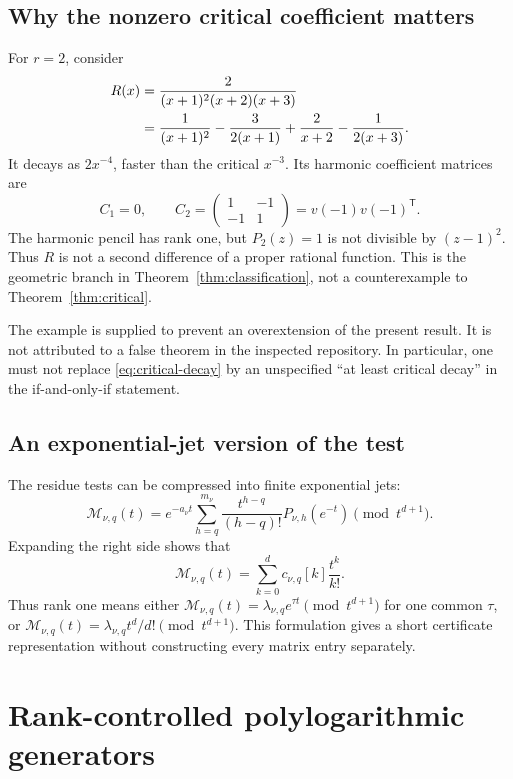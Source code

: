 \documentclass[11pt,letterpaper]{article}
\numberwithin{equation}{section}
\theoremstyle{definition}\newtheorem{definition}[theorem]{Definition}
\theoremstyle{remark}\newtheorem{remark}[theorem]{Remark}
\begin{document}
\subsection{Why the nonzero critical coefficient matters}
\label{sec:counterexample}
For $r=2$, consider
\begin{align}
 R(x)&=\frac{2}{(x+1)^2(x+2)(x+3)}\label{eq:counterexample}\\
 &=\frac1{(x+1)^2}-\frac{3}{2(x+1)}
       +\frac2{x+2}-\frac1{2(x+3)}.\notag
\end{align}
It decays as $2x^{-4}$, faster than the critical $x^{-3}$.
Its harmonic coefficient matrices are
\[
 C_1=0,\qquad
 C_2=\begin{pmatrix}1&-1\\-1&1\end{pmatrix}
       =v(-1)v(-1)^{\mathsf T}.
\]
The harmonic pencil has rank one, but $P_2(z)=1$ is not divisible
by $(z-1)^2$. Thus $R$ is not a second difference of a proper
rational function. This is the geometric branch in
Theorem~\ref{thm:classification}, not a counterexample to
Theorem~\ref{thm:critical}.

The example is supplied to prevent an overextension of the present
result. It is not attributed to a false theorem in the inspected
repository. In particular, one must not replace
\eqref{eq:critical-decay} by an unspecified ``at least critical decay''
in the if-and-only-if statement.

\subsection{An exponential-jet version of the test}
The residue tests can be compressed into finite exponential jets:
\begin{equation}\label{eq:jet-pencil}
 \mathcal M_{\nu,q}(t)=e^{-a_\nu t}
     \sum_{h=q}^{m_\nu}\frac{t^{h-q}}{(h-q)!}
             P_{\nu,h}(e^{-t})\pmod{t^{d+1}}.
\end{equation}
Expanding the right side shows that
\[
 \mathcal M_{\nu,q}(t)=\sum_{k=0}^d c_{\nu,q}[k]\frac{t^k}{k!}.
\]
Thus rank one means either
$\mathcal M_{\nu,q}(t)=\lambda_{\nu,q}e^{\tau t}\pmod{t^{d+1}}$
for one common $\tau$, or
$\mathcal M_{\nu,q}(t)=\lambda_{\nu,q}t^d/d!\pmod{t^{d+1}}$.
This formulation gives a short certificate representation without
constructing every matrix entry separately.

\section{Rank-controlled polylogarithmic generators}
\label{sec:polylogs}
\end{document}
